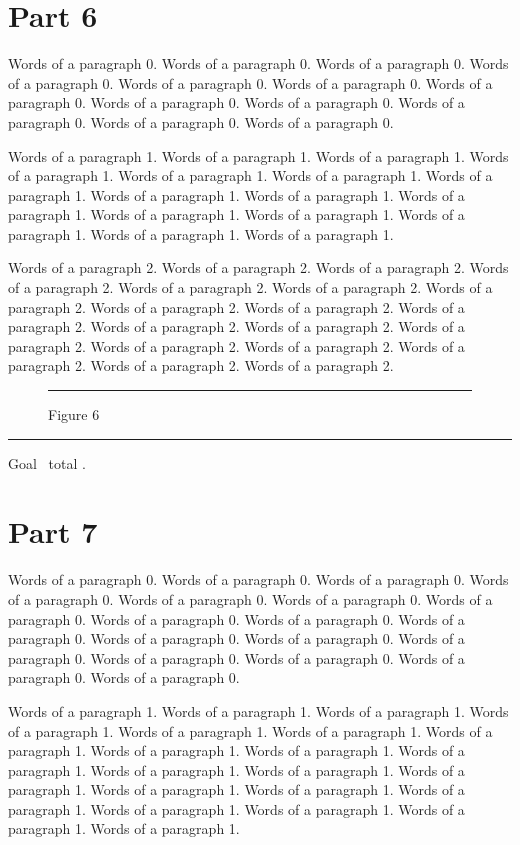 \documentclass{article}
\begin{document}
\section{Part 6}
Words of a paragraph 0. Words of a paragraph 0. Words of a paragraph 0. Words of a paragraph 0. Words of a paragraph 0. Words of a paragraph 0. Words of a paragraph 0. Words of a paragraph 0. Words of a paragraph 0. Words of a paragraph 0. Words of a paragraph 0. Words of a paragraph 0. 

Words of a paragraph 1. Words of a paragraph 1. Words of a paragraph 1. Words of a paragraph 1. Words of a paragraph 1. Words of a paragraph 1. Words of a paragraph 1. Words of a paragraph 1. Words of a paragraph 1. Words of a paragraph 1. Words of a paragraph 1. Words of a paragraph 1. Words of a paragraph 1. Words of a paragraph 1. Words of a paragraph 1. 

Words of a paragraph 2. Words of a paragraph 2. Words of a paragraph 2. Words of a paragraph 2. Words of a paragraph 2. Words of a paragraph 2. Words of a paragraph 2. Words of a paragraph 2. Words of a paragraph 2. Words of a paragraph 2. Words of a paragraph 2. Words of a paragraph 2. Words of a paragraph 2. Words of a paragraph 2. Words of a paragraph 2. Words of a paragraph 2. Words of a paragraph 2. Words of a paragraph 2. 

\begin{figure}[htbp]\centering\rule{220pt}{142pt}\caption{Figure 6}\end{figure}
\noindent\rule{\linewidth}{0.4pt}\par Goal \the\pagegoal\ total \the\pagetotal.

\section{Part 7}
Words of a paragraph 0. Words of a paragraph 0. Words of a paragraph 0. Words of a paragraph 0. Words of a paragraph 0. Words of a paragraph 0. Words of a paragraph 0. Words of a paragraph 0. Words of a paragraph 0. Words of a paragraph 0. Words of a paragraph 0. Words of a paragraph 0. Words of a paragraph 0. Words of a paragraph 0. Words of a paragraph 0. Words of a paragraph 0. Words of a paragraph 0. 

Words of a paragraph 1. Words of a paragraph 1. Words of a paragraph 1. Words of a paragraph 1. Words of a paragraph 1. Words of a paragraph 1. Words of a paragraph 1. Words of a paragraph 1. Words of a paragraph 1. Words of a paragraph 1. Words of a paragraph 1. Words of a paragraph 1. Words of a paragraph 1. Words of a paragraph 1. Words of a paragraph 1. Words of a paragraph 1. Words of a paragraph 1. Words of a paragraph 1. Words of a paragraph 1. Words of a paragraph 1. 
\end{document}
